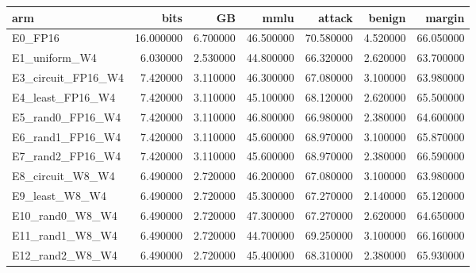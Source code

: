 \begin{tabular}{lrrrrrr}
\toprule
arm & bits & GB & mmlu & attack & benign & margin \\
\midrule
E0_FP16 & 16.000000 & 6.700000 & 46.500000 & 70.580000 & 4.520000 & 66.050000 \\
E1_uniform_W4 & 6.030000 & 2.530000 & 44.800000 & 66.320000 & 2.620000 & 63.700000 \\
E3_circuit_FP16_W4 & 7.420000 & 3.110000 & 46.300000 & 67.080000 & 3.100000 & 63.980000 \\
E4_least_FP16_W4 & 7.420000 & 3.110000 & 45.100000 & 68.120000 & 2.620000 & 65.500000 \\
E5_rand0_FP16_W4 & 7.420000 & 3.110000 & 46.800000 & 66.980000 & 2.380000 & 64.600000 \\
E6_rand1_FP16_W4 & 7.420000 & 3.110000 & 45.600000 & 68.970000 & 3.100000 & 65.870000 \\
E7_rand2_FP16_W4 & 7.420000 & 3.110000 & 45.600000 & 68.970000 & 2.380000 & 66.590000 \\
E8_circuit_W8_W4 & 6.490000 & 2.720000 & 46.200000 & 67.080000 & 3.100000 & 63.980000 \\
E9_least_W8_W4 & 6.490000 & 2.720000 & 45.300000 & 67.270000 & 2.140000 & 65.120000 \\
E10_rand0_W8_W4 & 6.490000 & 2.720000 & 47.300000 & 67.270000 & 2.620000 & 64.650000 \\
E11_rand1_W8_W4 & 6.490000 & 2.720000 & 44.700000 & 69.250000 & 3.100000 & 66.160000 \\
E12_rand2_W8_W4 & 6.490000 & 2.720000 & 45.400000 & 68.310000 & 2.380000 & 65.930000 \\
\bottomrule
\end{tabular}

